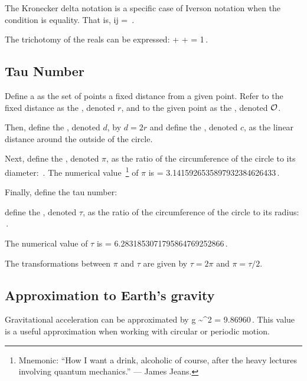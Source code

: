 The Kronecker delta notation is a specific case of Iverson notation when the condition is equality. That is,
\beq
\ikron ij = \,.
\eeq

The trichotomy of the reals can be expressed:
\beq
{} +  +  = 1\,.
\eeq


\subsection{Tau Number}
Define a  as the set of points a fixed distance from a given point. Refer to the fixed distance as the , denoted $r$, and to the given point as the , denoted $\mathcal{O}$. 

Then, define the , denoted $d$, by $d = 2r$ and define the , denoted $c$, as the linear distance around the outside of the circle.

Next, define the , denoted $\pi$, as the ratio of the circumference of the circle to its diameter:
\beq
\pi {} {}\,.
\eeq
The numerical value~\footnote{Mnemonic: ``How I want a drink, alcoholic of course, after the heavy lectures involving quantum mechanics.'' --- James Jeans.} of $\pi$ is
\beq
\pi = \num{3.14159 26535 89793 23846 26433}\dotsc\,.
\eeq

Finally, define the tau number:

\begin{definition}
define the , denoted $\tau$, as the ratio of the circumference of the circle to its radius:
\beq
\tau {} {}\,.
\eeq
\end{definition}

The numerical value of $\tau$ is
\beq
\tau = \num{6.28318 53071 79586 47692 52866}\dotsc\,.
\eeq

\begin{note}
The transformations between $\pi$ and $\tau$ are given by $\tau = 2\pi$ and $\pi = \tau/2$.
\end{note}


\subsection{Approximation to Earth's gravity}
Gravitational acceleration can be approximated by
\beq
g \sim \pi^2 = 9.86960\dotsc \,.
\eeq
This value is a useful approximation when working with circular or periodic motion.


